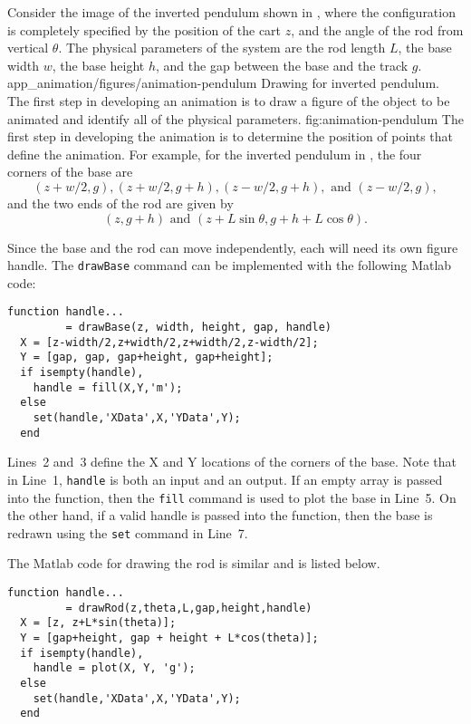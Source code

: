 
Consider the image of the inverted pendulum shown in , where the configuration is completely specified by the position of the cart $z$, and the angle of the rod from vertical $\theta$.  The physical parameters of the system are the rod length $L$, the base width $w$, the base height $h$, and the gap between the base and the track $g$.
	{app_animation/figures/animation-pendulum}
	{Drawing for inverted pendulum.  The first step in developing an animation is to draw a figure of the object to be animated and identify all of the physical parameters.}
	{fig:animation-pendulum}
The first step in developing the animation is to determine the position of points that define the animation.  For example, for the inverted pendulum in , the four corners of the base are
\[
(z+w/2, g), (z+w/2, g+h), (z-w/2, g+h), \text{ and } (z-w/2, g),
\]
and the two ends of the rod are given by
\[
(z, g+h) \text{ and } (z+L\sin\theta, g+h+L\cos\theta).
\]

Since the base and the rod can move independently, each will need its own figure handle.  The {\tt drawBase} command can be implemented with the following Matlab code:
\begin{lstlisting}
function handle...
         = drawBase(z, width, height, gap, handle)
  X = [z-width/2,z+width/2,z+width/2,z-width/2];
  Y = [gap, gap, gap+height, gap+height];
  if isempty(handle),
    handle = fill(X,Y,'m');
  else
	set(handle,'XData',X,'YData',Y);
  end
\end{lstlisting}
Lines~2 and~3 define the X and Y locations of the corners of the base.
Note that in Line~1, {\tt handle} is both an input and an output.  If an empty array is passed into the function, then the {\tt fill} command is used to plot the base in Line~5.  On the other hand, if a valid handle is passed into the function, then the base is redrawn using the {\tt set} command in Line~7.

The Matlab code for drawing the rod is similar and is listed below.
\begin{lstlisting}
function handle...
         = drawRod(z,theta,L,gap,height,handle)
  X = [z, z+L*sin(theta)];
  Y = [gap+height, gap + height + L*cos(theta)];
  if isempty(handle),
    handle = plot(X, Y, 'g');
  else
    set(handle,'XData',X,'YData',Y);
  end
\end{lstlisting}


